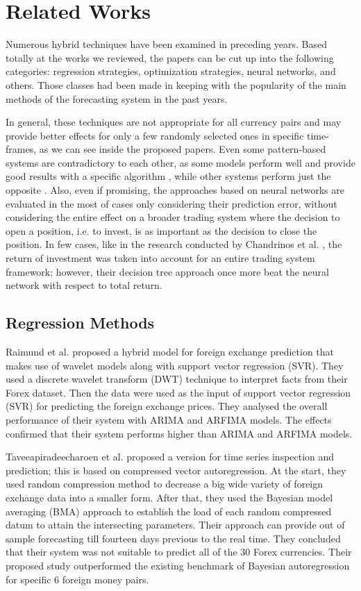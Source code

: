 \section{Related Works}
\label{sec:2}

Numerous hybrid techniques have been examined in preceding years. Based totally at the works we reviewed, the papers can be cut up into the following categories: regression strategies, optimization strategies, neural networks, and others. Those classes had been made in keeping with the popularity of the main methods of the forecasting system in the past years.

In general, these techniques are not appropriate for all currency pairs and may provide better effects for only a few randomly selected ones in specific time-frames, as we can see inside the proposed papers. 
Even some pattern-based systems are contradictory to each other, as some models perform well and provide good results with a specific algorithm \cite{8376549}, while other systems perform just the opposite \cite{CONTRERAS20181}.
Also, even if promising, the approaches based on neural networks are evaluated in the most of cases only considering their prediction error, without considering the entire effect on a broader trading system where the decision to open a position, i.e. to invest, is as important as the decision to close the position. In few cases, like in the research conducted by Chandrinos et al. \cite{Chandrinos18}, the return of investment was taken into account for an entire trading system framework; however, their decision tree approach once more beat the neural network with respect to total return. 


\subsection{Regression Methods}

Raimund et al. \cite{Raimundo18} proposed a hybrid model for foreign exchange prediction that makes use of wavelet models along with support vector regression (SVR). They used a discrete wavelet transform (DWT) technique to interpret facts from their Forex dataset. Then the data were used as the input of support vector regression (SVR) for predicting the foreign exchange prices. They analysed the overall performance of their system with ARIMA and ARFIMA models. The effects confirmed that their system performs higher than ARIMA and ARFIMA models. 

Taveeapiradeecharoen et al. \citep{Taveeapiradeecharoen19} proposed a version for time series inspection and prediction; this is based on compressed vector autoregression. At the start, they used random compression method to decrease a big wide variety of foreign exchange data into a smaller form. After that, they used the Bayesian model averaging (BMA) approach to establish the load of each random compressed datum to attain the intersecting parameters. Their approach can provide out of sample forecasting till fourteen days previous to the real time. They concluded that their system was not suitable to predict all of the 30 Forex currencies. Their proposed study outperformed the existing benchmark of Bayesian autoregression for specific 6 foreign money pairs. 

